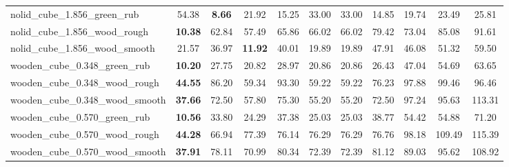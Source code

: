 \begin{table}[H]
{\begin{tabular}{l cccccccccc}
        nolid\_cube\_1.856\_green\_rub & 54.38 & \textbf{8.66} & 21.92 & 15.25 & 33.00 & 33.00 & 14.85 & 19.74 & 23.49 & 25.81 \\
        nolid\_cube\_1.856\_wood\_rough & \textbf{10.38} & 62.84 & 57.49 & 65.86 & 66.02 & 66.02 & 79.42 & 73.04 & 85.08 & 91.61 \\
        nolid\_cube\_1.856\_wood\_smooth & 21.57 & 36.97 & \textbf{11.92} & 40.01 & 19.89 & 19.89 & 47.91 & 46.08 & 51.32 & 59.50 \\
        wooden\_cube\_0.348\_green\_rub & \textbf{10.20} & 27.75 & 20.82 & 28.97 & 20.86 & 20.86 & 26.43 & 47.04 & 54.69 & 63.65 \\
        wooden\_cube\_0.348\_wood\_rough & \textbf{44.55} & 86.20 & 59.34 & 93.30 & 59.22 & 59.22 & 76.23 & 97.88 & 99.46 & 96.46 \\
        wooden\_cube\_0.348\_wood\_smooth & \textbf{37.66} & 72.50 & 57.80 & 75.30 & 55.20 & 55.20 & 72.50 & 97.24 & 95.63 & 113.31 \\
        wooden\_cube\_0.570\_green\_rub & \textbf{10.56} & 33.80 & 24.29 & 37.38 & 25.03 & 25.03 & 38.77 & 54.42 & 54.88 & 71.20 \\
        wooden\_cube\_0.570\_wood\_rough & \textbf{44.28} & 66.94 & 77.39 & 76.14 & 76.29 & 76.29 & 76.76 & 98.18 & 109.49 & 115.39 \\
        wooden\_cube\_0.570\_wood\_smooth & \textbf{37.91} & 78.11 & 70.99 & 80.34 & 72.39 & 72.39 & 81.12 & 89.03 & 95.62 & 108.92 \\
        \bottomrule
    \end{tabular}
    }
\end{table}
